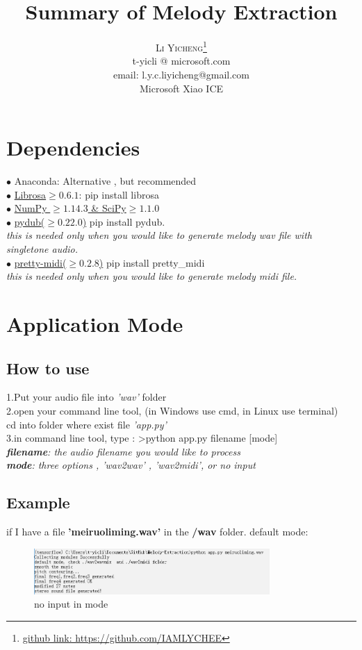 \documentclass[twoside]{article}
\title{\vspace{-15mm}\fontsize{24pt}{10pt}\selectfont\textbf{Summary of Melody Extraction}} %
\author{
\large
\textsc{Li Yicheng}\thanks{\href{https://github.com/IAMLYCHEE?tab=repositories}{github link: https://github.com/IAMLYCHEE} }\\[2mm] %
\normalsize t-yicli @ microsoft.com\\
\normalsize email: l.y.c.liyicheng@gmail.com \\ %
\normalsize Microsoft Xiao ICE \\
\vspace{-5mm}
}
\date{}
\begin{document}
\section{Dependencies}
$\bullet$ Anaconda: Alternative , but recommended \\
$\bullet$ \href{https://github.com/librosa/librosa}{Librosa$\geq 0.6.1$}: \colorbox{gray!40}{pip install librosa}\\
$\bullet$ \href{http://www.scipy.org/}{NumPy $\geq 1.14.3$ \& SciPy$\geq 1.1.0$} \\
$\bullet$ \href{https://github.com/jiaaro/pydub}{pydub($\geq 0.22.0$)} \colorbox{gray!40}{pip install pydub}. \\
\textit{this is needed only when you would like to generate melody wav file with singletone audio.}\\
$\bullet$ \href{https://github.com/craffel/pretty-midi}{pretty-midi($\geq 0.2.8$)} \colorbox{gray!40}{pip install pretty\_midi}\\
\textit{this is needed only when you would like to generate melody midi file.}\\


\section{Application Mode}
\subsection{How to use}
1.Put your audio file into \textit{'wav'} folder\\
2.open your command line tool, (in Windows use cmd, in Linux use terminal) \\cd into folder where exist file \textit{'app.py'}\\
3.in command line tool, type : \colorbox{gray!40}{>python app.py filename [mode]}\\
\textit{\textbf{filename}: the audio filename you would like to process}\\
\textit{\textbf{mode}: three options , 'wav2wav' , 'wav2midi', or no input}\\

\subsection{Example}
if I have a file \textbf{'meiruoliming.wav'} in the \textbf{/wav} folder.
default mode:
\begin{figure}[H]
   \centering
   \includegraphics[width = 0.8\textwidth]{default.PNG}  
   \caption{no input in mode}
\end{figure}
\end{document}
